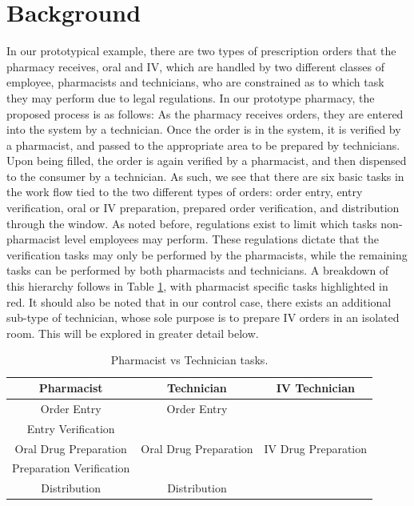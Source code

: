\documentclass[10pt]{report}            %
\begin{document}
\section*{Background}
In our prototypical example, there are two types of prescription orders that the pharmacy receives, oral and IV, which are handled by two different classes of employee, pharmacists and technicians, who are constrained as to which task they may perform due to legal regulations. In our prototype pharmacy, the proposed process is as follows: As the pharmacy receives orders, they are entered into the system by a technician. Once the order is in the system, it is verified by a pharmacist, and passed to the appropriate area to be prepared by technicians. Upon being filled, the order is again verified by a pharmacist, and then dispensed to the consumer by a technician. As such, we see that there are six basic tasks in the work flow tied to the two different types of orders: order entry, entry verification, oral or IV preparation, prepared order verification, and distribution through the window. As noted before, regulations exist to limit which tasks non-pharmacist level employees may perform. These regulations dictate that the verification tasks may only be performed by the pharmacists, while the remaining tasks can be performed by both pharmacists and technicians. A breakdown of this hierarchy follows in Table \ref{table:tasks}, with pharmacist specific tasks highlighted in red. It should also be noted that in our control case, there exists an additional sub-type of technician, whose sole purpose is to prepare IV orders in an isolated room. This will be explored in greater detail below.
\begin{table}[H]
\centering
\begin{tabular}{|c||c||c|}
\hline
Pharmacist & Technician & IV Technician\\\hline\hline
Order Entry & Order Entry & \cellcolor{black}\\\hline
\cellcolor{red!25}Entry Verification &\cellcolor{black}& \cellcolor{black}\\\hline
Oral Drug Preparation & Oral Drug Preparation & \cellcolor{blue!25}IV Drug Preparation\\\hline
\cellcolor{red!25}Preparation Verification &\cellcolor{black}&\cellcolor{black}\\\hline
Distribution & Distribution&\cellcolor{black}\\\hline
\end{tabular}
\caption{Pharmacist vs Technician tasks.}
\label{table:tasks}
\end{table}
\end{document}
